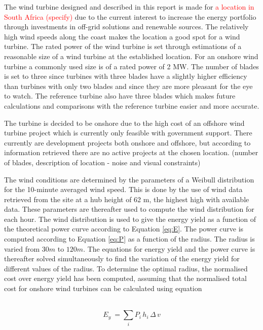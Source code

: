 The wind turbine designed and described in this report is made for \textcolor{red}{a location in South Africa (specify)} due to the current interest to increase the energy portfolio through investments in off-grid solutions and renewable sources. The relatively high wind speeds along the coast makes the location a good spot for a wind turbine. The rated power of the wind turbine is set through estimations of a reasonable size of a wind turbine at the established location. For an onshore wind turbine a commonly used size is of a rated power of 2 MW. The number of blades is set to three since turbines with three blades have a slightly higher efficiency than turbines with only two blades and since they are more pleasant for the eye to watch. The reference turbine also have three blades which makes future calculations and comparisons with the reference turbine easier and more accurate.

The turbine is decided to be onshore due to the high cost of an offshore wind turbine project which is currently only feasible with government support. There currently are development projects both onshore and offshore, but according to information retrieved there are no active projects at the chosen location. (number of blades, description of location - noise and visual constraints)

The wind conditions are determined by the parameters of a Weibull distribution for the 10-minute averaged wind speed. This is done by the use of wind data retrieved from the site at a hub height of 62 m, the highest high with available data. These parameters are thereafter used to compute the wind distribution for each hour. The wind distribution is used to give the energy yield as a function of the theoretical power curve according to Equation \ref{eq:E}. The power curve is computed according to Equation \ref{eq:P} as a function of the radius. The radius is varied from $30 m$ to $120 m$. The equations for energy yield and the power curve is thereafter solved simultaneously to find the variation of the energy yield for different values of the radius. To determine the optimal radius, the normalised cost over energy yield has been computed, assuming that the normalised total cost for onshore wind turbines can be calculated using equation

\\

\begin{equation}
E_{y}\ = \sum_{i} P_{i}\, h_{i}\, \Delta \, v
\label{eq:E}
\end{equation}

